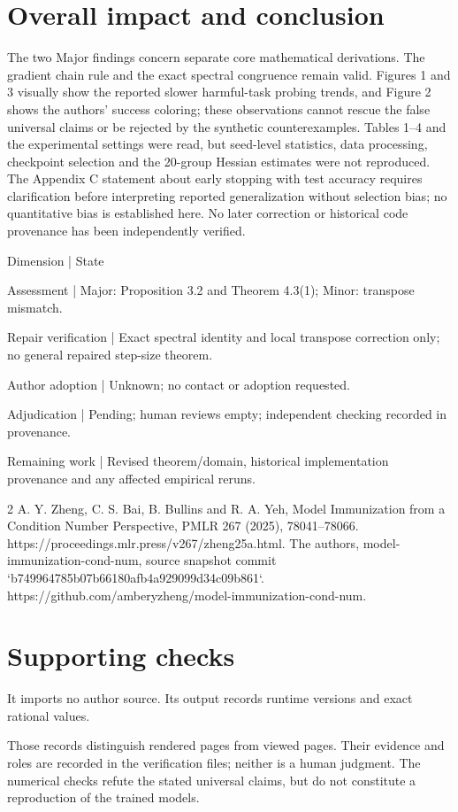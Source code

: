 \documentclass[10pt]{article}
\begin{document}
\section*{Overall impact and conclusion}
The two Major findings concern separate core mathematical derivations. The gradient chain rule and the exact spectral congruence remain valid. Figures 1 and 3 visually show the reported slower harmful-task probing trends, and Figure 2 shows the authors’ success coloring; these observations cannot rescue the false universal claims or be rejected by the synthetic counterexamples. Tables 1–4 and the experimental settings were read, but seed-level statistics, data processing, checkpoint selection and the 20-group Hessian estimates were not reproduced. The Appendix C statement about early stopping with test accuracy requires clarification before interpreting reported generalization without selection bias; no quantitative bias is established here. No later correction or historical code provenance has been independently verified.\par
Dimension | State\par
Assessment | Major: Proposition 3.2 and Theorem 4.3(1); Minor: transpose mismatch.\par
Repair verification | Exact spectral identity and local transpose correction only; no general repaired step-size theorem.\par
Author adoption | Unknown; no contact or adoption requested.\par
Adjudication | Pending; human reviews empty; independent checking recorded in provenance.\par
Remaining work | Revised theorem/domain, historical implementation provenance and any affected empirical reruns.\par
2 A. Y. Zheng, C. S. Bai, B. Bullins and R. A. Yeh, Model Immunization from a Condition Number Perspective, PMLR 267 (2025), 78041–78066. https://proceedings.mlr.press/v267/zheng25a.html. The authors, model-immunization-cond-num, source snapshot commit `b749964785b07b66180afb4a929099d34c09b861`. https://github.com/amberyzheng/model-immunization-cond-num.\par
\section*{Supporting checks}
It imports no author source. Its output records runtime versions and exact rational values.\par
Those records distinguish rendered pages from viewed pages. Their evidence and roles are recorded in the verification files; neither is a human judgment. The numerical checks refute the stated universal claims, but do not constitute a reproduction of the trained models.\par
\end{document}
